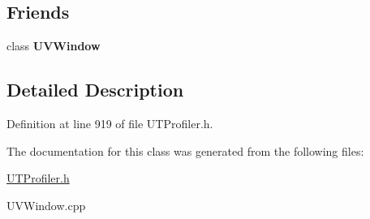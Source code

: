 \subsection*{Friends}
\begin{DoxyCompactItemize}
\item 
\hypertarget{class_new_u_v_window_a33aa3c7d8986c4fe6396f8bf84221386}{class {\bfseries U\-V\-Window}}\label{class_new_u_v_window_a33aa3c7d8986c4fe6396f8bf84221386}

\end{DoxyCompactItemize}


\subsection{Detailed Description}


Definition at line 919 of file U\-T\-Profiler.\-h.



The documentation for this class was generated from the following files\-:\begin{DoxyCompactItemize}
\item 
\hyperlink{_u_t_profiler_8h}{U\-T\-Profiler.\-h}\item 
U\-V\-Window.\-cpp\end{DoxyCompactItemize}
